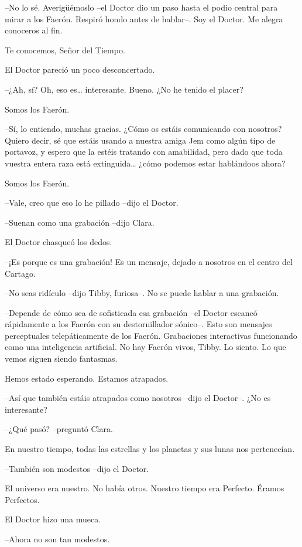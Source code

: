 {--No lo sé. Averigüémoslo --el Doctor dio un paso hasta el podio central
 para mirar a los Faerón. Respiró hondo antes de hablar--. Soy el Doctor.
Me alegra conoceros al fin.}

{Te conocemos, Señor del Tiempo.}

{El Doctor pareció un poco desconcertado.}

{--¿Ah, sí? Oh, eso es\ldots{} interesante. Bueno. ¿No he tenido el
placer?}

{Somos los Faerón.}

{--Sí, lo entiendo, muchas gracias. ¿Cómo os estáis comunicando con
 nosotros? Quiero decir, sé que estáis usando a nuestra amiga Jem como
 algún tipo de portavoz, y espero que la estéis tratando con amabilidad,
 pero dado que toda vuestra entera raza está extinguida\ldots{} ¿cómo
podemos estar hablándoos ahora?}

{Somos los Faerón.}

{--Vale, creo que eso lo he pillado --dijo el Doctor.}

{--Suenan como una grabación --dijo Clara.}

{El Doctor chasqueó los dedos.}

{--¡Es porque es una grabación! Es un mensaje, dejado a nosotros en el
centro del Cartago.}

{--No seas ridículo --dijo Tibby, furiosa--. No se puede hablar a una
grabación.}

{--Depende de cómo sea de sofisticada esa grabación --el Doctor escaneó
 rápidamente a los Faerón con su destornillador sónico--. Esto son
 mensajes perceptuales telepáticamente de los Faerón. Grabaciones
 interactivas funcionando como una inteligencia artificial. No hay Faerón
vivos, Tibby. Lo siento. Lo que vemos siguen siendo fantasmas.}

{Hemos estado esperando. Estamos atrapados.}

{--Así que también estáis atrapados como nosotros --dijo el Doctor--. ¿No
es interesante?}

{--¿Qué pasó? --preguntó Clara.}

{En nuestro tiempo, todas las estrellas y los planetas y sus lunas nos
pertenecían.}

{--También son modestos --dijo el Doctor.}

{El universo era nuestro. No había otros. Nuestro tiempo era Perfecto.
Éramos Perfectos.}

{El Doctor hizo una mueca.}

{--Ahora no son tan modestos.}

